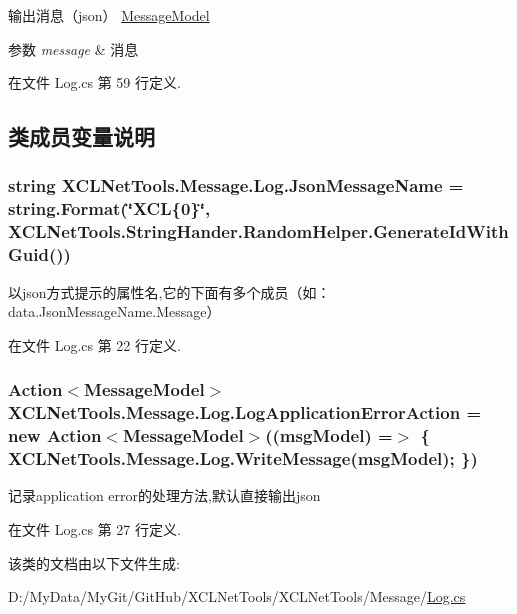 输出消息（json） \hyperlink{class_x_c_l_net_tools_1_1_message_1_1_message_model}{Message\-Model} 


\begin{DoxyParams}{参数}
{\em message} & 消息\\
\hline
\end{DoxyParams}


在文件 Log.\-cs 第 59 行定义.



\subsection{类成员变量说明}
\hypertarget{class_x_c_l_net_tools_1_1_message_1_1_log_ac9218999b3da2b5fbd7476e1ae47ca71}{
\subsubsection[{Json\-Message\-Name}]{\setlength{\rightskip}{0pt plus 5cm}string X\-C\-L\-Net\-Tools.\-Message.\-Log.\-Json\-Message\-Name = string.\-Format(\char`\"{}X\-C\-L\{0\}\char`\"{}, X\-C\-L\-Net\-Tools.\-String\-Hander.\-Random\-Helper.\-Generate\-Id\-With\-Guid())\hspace{0.3cm}{\ttfamily [static]}}}\label{class_x_c_l_net_tools_1_1_message_1_1_log_ac9218999b3da2b5fbd7476e1ae47ca71}


以json方式提示的属性名,它的下面有多个成员（如：data.\-Json\-Message\-Name.\-Message） 



在文件 Log.\-cs 第 22 行定义.

\hypertarget{class_x_c_l_net_tools_1_1_message_1_1_log_aeb571cf7294cbdc7776e44c5654b28d4}{
\subsubsection[{Log\-Application\-Error\-Action}]{\setlength{\rightskip}{0pt plus 5cm}Action$<${\bf Message\-Model}$>$ X\-C\-L\-Net\-Tools.\-Message.\-Log.\-Log\-Application\-Error\-Action = new Action$<${\bf Message\-Model}$>$((msg\-Model) =$>$ \{ {\bf X\-C\-L\-Net\-Tools.\-Message.\-Log.\-Write\-Message}(msg\-Model); \})\hspace{0.3cm}{\ttfamily [static]}}}\label{class_x_c_l_net_tools_1_1_message_1_1_log_aeb571cf7294cbdc7776e44c5654b28d4}


记录application error的处理方法,默认直接输出json 



在文件 Log.\-cs 第 27 行定义.



该类的文档由以下文件生成\-:\begin{DoxyCompactItemize}
\item 
D\-:/\-My\-Data/\-My\-Git/\-Git\-Hub/\-X\-C\-L\-Net\-Tools/\-X\-C\-L\-Net\-Tools/\-Message/\hyperlink{_log_8cs}{Log.\-cs}\end{DoxyCompactItemize}
